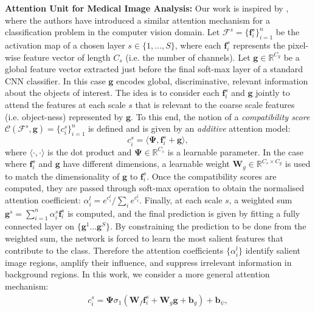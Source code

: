 \documentclass{article}
\providecommand{\mb}[1]{\mathbf{#1}}
\providecommand{\mbb}[1]{\boldsymbol{#1}}
\begin{document}
\textbf{Attention Unit for Medical Image Analysis:} Our work is inspired by \cite{jetley2018learn}, where the authors have introduced a similar attention mechanism for a classification problem in the computer vision domain. Let $\mathcal{F}^s = \{ \mb{f}_i^{s} \}_{i=1}^n$ be the activation map of a chosen layer $s\in \{1, \dots, S\}$, where each $\mb{f}_i^{s}$ represents the pixel-wise feature vector of length $C_s$ (i.e. the number of channels). Let $\mb{g} \in \mathbb{R}^{C_g}$ be a global feature vector extracted just before the final soft-max layer of a standard CNN classifier. In this case $\mb{g}$ encodes global, discriminative, relevant information about the objects of interest. The idea is to consider each $\mb{f}_i^{s}$ and $\mb{g}$ jointly to attend the features at each scale $s$ that is relevant to the coarse scale features (i.e. object-ness) represented by $\mb{g}$. To this end, the notion of a \emph{compatibility score} $\mathcal{C}(\mathcal{F}^s, \mb{g}) = \{c_i^s\}_{i=1}^n$ is defined and is given by an \emph{additive} attention model:
\begin{equation}
c_i^s = \langle \mbb{\Psi}, \mb{f}_i^s + \mb{g} \rangle , 
\end{equation}
where  $\langle\cdot,\cdot\rangle$ is the dot product and $\mbb{\Psi} \in \mathbb{R}^{C_s}$ is a learnable parameter. In the case where $\mb{f}_i^s$ and $\mb{g}$ have different dimensions, a learnable weight $\mb{W}_g \in \mathbb{R}^{C_s \times C_g}$ is used to match the dimensionality of $\mb{g}$ to $\mb{f}_i^s$. Once the compatibility scores are computed, they are passed through soft-max operation to obtain the normalised attention coefficient: $\alpha_i^l = e^{c_i^l}/\sum_i e^{c_i^l}$. Finally, at each scale $s$, a  weighted sum $\mb{g}^s = \sum_{i=1}^n \alpha_i^s \mb{f}_i^s$ is computed, and the final prediction is given by fitting a fully connected layer on $\{\mb{g}^1 \dots \mb{g}^S\}$. By constraining the prediction to be done from the weighted sum, the network is forced to learn the most salient features that contribute to the class. Therefore the attention coefficients $\{\alpha_i^l\}$ identify salient image regions, amplify their influence, and suppress irrelevant information in background regions. In this work, we consider a more general attention mechanism: 
\begin{gather}
c_i^s = \mbb{\Psi} \sigma_1 \left(\mb{W}_f \mb{f}_i^s + \mb{W}_g \mb{g} + \mb{b}_g \right) + \mb{b}_\psi ,
\end{gather}
\end{document}
